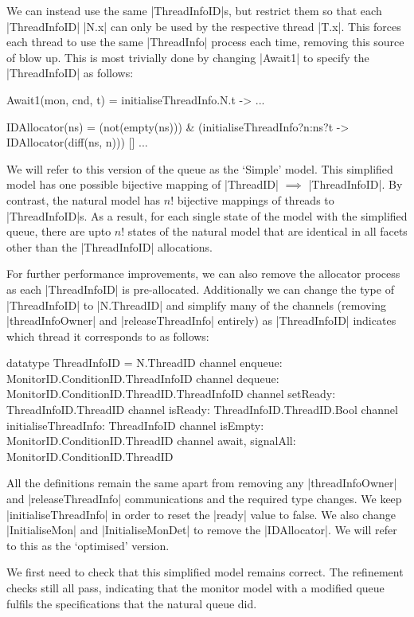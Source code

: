 We can instead use the same |ThreadInfoID|s, but restrict them so that each |ThreadInfoID| |N.x| can only be used by the respective thread |T.x|. This forces each thread to use the same |ThreadInfo| process each time, removing this source of blow up. This is most trivially done by changing |Await1| to specify the |ThreadInfoID| as follows:

\begin{cspm}
  Await1(mon, cnd, t) = initialiseThreadInfo.N.t -> ...

  IDAllocator(ns) = 
      (not(empty(ns))) & (initialiseThreadInfo?n:ns?t -> IDAllocator(diff(ns, {n}))) 
   [] ...
\end{cspm}

We will refer to this version of the queue as the `Simple' model. This simplified model has one possible bijective mapping of |ThreadID| $\implies$ |ThreadInfoID|. By contrast, the natural model has $n!$ bijective mappings of threads to |ThreadInfoID|s. As a result, for each single state of the model with the simplified queue, there are upto $n!$ states of the natural model that are identical in all facets other than the |ThreadInfoID| allocations.

For further performance improvements, we can also remove the allocator process as each |ThreadInfoID| is pre-allocated. Additionally we can change the type of |ThreadInfoID| to |N.ThreadID| and simplify many of the channels (removing |threadInfoOwner| and |releaseThreadInfo| entirely) as |ThreadInfoID| indicates which thread it corresponds to as follows:

\begin{cspm}
  datatype ThreadInfoID = N.ThreadID
  channel enqueue: MonitorID.ConditionID.ThreadInfoID 
  channel dequeue: MonitorID.ConditionID.ThreadID.ThreadInfoID
  channel setReady: ThreadInfoID.ThreadID
  channel isReady: ThreadInfoID.ThreadID.Bool
  channel initialiseThreadInfo: ThreadInfoID
  channel isEmpty: MonitorID.ConditionID.ThreadID
  channel await, signalAll: MonitorID.ConditionID.ThreadID
\end{cspm}

All the definitions remain the same apart from removing any |threadInfoOwner| and |releaseThreadInfo| communications and the required type changes. We keep |initialiseThreadInfo| in order to reset the |ready| value to false. We also change |InitialiseMon| and |InitialiseMonDet| to remove the |IDAllocator|. We will refer to this as the `optimised' version.

We first need to check that this simplified model remains correct. The refinement checks still all pass, indicating that the monitor model with a modified queue fulfils the specifications that the natural queue did.

